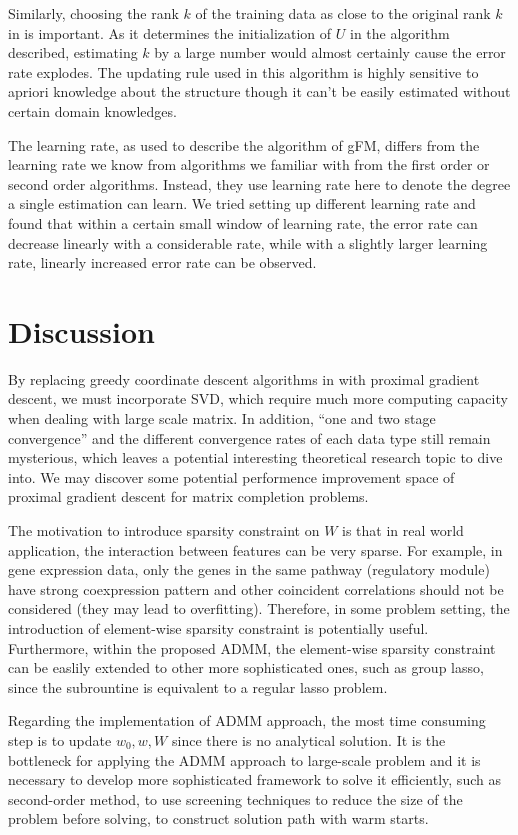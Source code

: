 \documentclass{article}
\begin{document}
Similarly, choosing the rank $k$ of the training data as close to the original rank $k$ in is important. As it determines the initialization of $U$ in the algorithm described, estimating $k$ by a large number would almost certainly cause the error rate explodes. The updating rule used in this algorithm is highly sensitive to apriori knowledge about the structure though it can't be easily estimated without certain domain knowledges.

The learning rate, as used to describe the algorithm of gFM, differs from the learning rate we know from algorithms we familiar with from the first order or second order algorithms. Instead, they use learning rate here to denote the degree a single estimation can learn. We tried setting up different learning rate and found that within a certain small window of learning rate, the error rate can decrease linearly with a considerable rate, while with a slightly larger learning rate, linearly increased error rate can be observed.

\section{Discussion}

By replacing greedy coordinate descent algorithms in \cite{convexFM_paper} with proximal gradient descent, we must incorporate SVD, which require much more computing capacity when dealing with large scale matrix. In addition, “one and two stage convergence” and the different convergence rates of each data type still remain mysterious, which leaves a potential interesting theoretical research topic to dive into. We may discover some potential performence improvement space of proximal gradient descent for matrix completion problems.

The motivation to introduce sparsity constraint on $W$ is that in real world application, the interaction between features can be very sparse. For example, in gene expression data, only the genes in the same pathway (regulatory module) have strong coexpression pattern and other coincident correlations should not be considered (they may lead to overfitting). Therefore, in some problem setting, the introduction of element-wise sparsity constraint is potentially useful. Furthermore, within the proposed ADMM, the element-wise sparsity constraint can be easlily extended to other more sophisticated ones, such as group lasso, since the subrountine is equivalent to a regular lasso problem.

Regarding the implementation of ADMM approach, the most time consuming step is to update $w_0, w, W$ since there is no analytical solution. It is the bottleneck for applying the ADMM approach to large-scale problem and it is necessary to develop more sophisticated framework to solve it efficiently, such as second-order method, to use screening techniques to reduce the size of the problem before solving, to construct solution path with warm starts.
\end{document}
